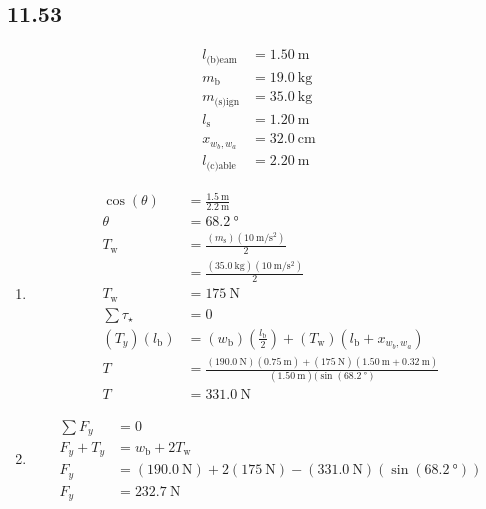 \documentclass{article}
\begin{document}
\subsection{11.53}
\begin{align*}
	l_\text{(b)eam} & = \SI{1.50}{\meter} \\
	m_\text{b} & = \SI{19.0}{\kilogram} \\
	m_\text{(s)ign} & = \SI{35.0}{\kilogram} \\
	l_\text{s} & = \SI{1.20}{\meter} \\
	x_{w_b,w_a} & = \SI{32.0}{\centi \meter} \\
	l_\text{(c)able} & = \SI{2.20}{\meter}
\end{align*}
\begin{enumerate}[label=\textbf{(\alph*)}]
	\item
		\begin{align*}
			\cos(\theta) & = \frac{\SI{1.5}{\meter}}{\SI{2.2}{\meter}} \\
			\theta & = \SI{68.2}{\degree} \\
			T_\text{w} & = \frac{(m_\text{s})(\SI{10}{\meter \per \second \squared})}{2} \\
					   & = \frac{(\SI{35.0}{\kilogram})(\SI{10}{\meter \per \second \squared})}{2} \\
			T_\text{w} & = \SI{175}{\newton} \\
			\sum \tau_\star & = 0 \\
			(T_y)(l_\text{b}) & = (w_\text{b}) \left( \frac{l_\text{b}}{2} \right) + (T_\text{w})(l_\text{b} + x_{w_b,w_a}) \\
			T & = \frac{(\SI{190.0}{\newton})(\SI{0.75}{\meter}) + (\SI{175}{\newton})(\SI{1.50}{\meter} + \SI{0.32}{\meter})}{(\SI{1.50}{\meter})(\sin(\SI{68.2}{\degree})} \\
			T & = \SI{331.0}{\newton}
		\end{align*}
	\item
		\begin{align*}
			\sum F_y & = 0 \\
			F_y + T_y & = w_\text{b} + 2T_\text{w} \\
			F_y & = (\SI{190.0}{\newton}) + 2(\SI{175}{\newton}) - (\SI{331.0}{\newton})(\sin(\SI{68.2}{\degree})) \\
			F_y & = \SI{232.7}{\newton}
		\end{align*}
\end{enumerate}
\end{document}
